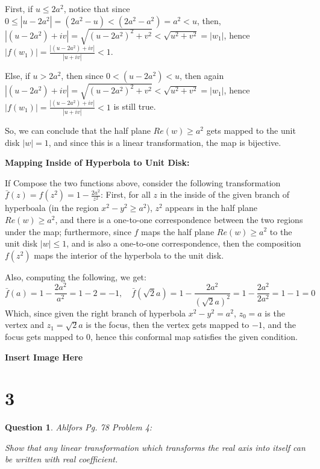 \documentclass{article}
\newtheorem{question}{Question}
\begin{document}
First, if $u\leq 2a^2$, notice that since $0\leq |u-2a^2| = (2a^2-u) < (2a^2-a^2)=a^2 < u$, then, $|(u-2a^2)+iv|=\sqrt{(u-2a^2)^2+v^2}< \sqrt{u^2+v^2} = |w_1|$,
hence $|f(w_1)|=\frac{|(u-2a^2)+iv|}{|u+iv|} < 1$.

Else, if $u>2a^2$, then since $0<(u-2a^2)<u$, then again $|(u-2a^2)+iv|=\sqrt{(u-2a^2)^2+v^2}< \sqrt{u^2+v^2} = |w_1|$, hence $|f(w_1)|=\frac{|(u-2a^2)+iv|}{|u+iv|} < 1$ is still true.

So, we can conclude that the half plane $Re(w)\geq a^2$ gets mapped to the unit disk $|w|=1$, and since this is a linear transformation, the map is bijective.

\hfill

\textbf{Mapping Inside of Hyperbola to Unit Disk:}

If Compose the two functions above, consider the following transformation $\bar{f}(z)=f(z^2)=1-\frac{2a^2}{z^2}$:
First, for all $z$ in the inside of the given branch of hyperboala (in the region $x^2-y^2\geq a^2$), $z^2$ appears in the half plane $Re(w)\geq a^2$, and there is a one-to-one correspondence between the two regions under the map;
furthermore, since $f$ maps the half plane $Re(w)\geq a^2$ to the unit disk $|w|\leq 1$, and is also a one-to-one correspondence, then the composition $f(z^2)$ maps the interior of the hyperbola to the unit disk.

Also, computing the following, we get:
$$\bar{f}(a)=1-\frac{2a^2}{a^2}=1-2=-1,\quad \bar{f}(\sqrt{2}a)=1-\frac{2a^2}{(\sqrt{2}a)^2}=1-\frac{2a^2}{2a^2}=1-1=0$$
Which, since given the right branch of hyperbola $x^2-y^2=a^2$, $z_0=a$ is the vertex and $z_1=\sqrt{2}a$ is the focus,
then the vertex gets mapped to $-1$, and the focus gets mapped to $0$, hence this conformal map satisfies the given condition.

\textbf{Insert Image Here}

\break

\section*{3}
\begin{myBox}[]{}
    \begin{question}
        Ahlfors Pg. 78 Problem 4:

        Show that any linear transformation which transforms the real axis
        into itself can be written with real coefficient.
    \end{question}
\end{myBox}
\end{document}
